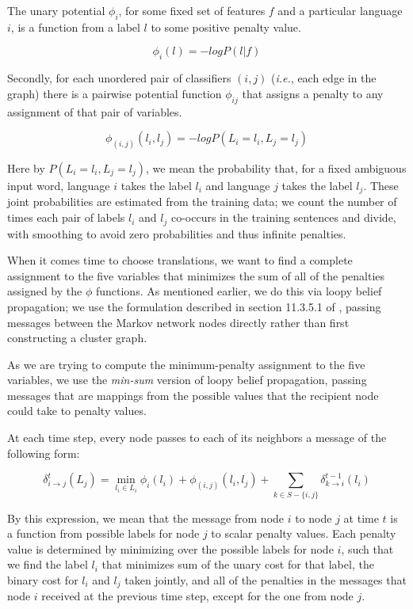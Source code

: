 \documentclass[11pt,letterpaper]{article}
\begin{document}
The unary potential $\phi_i$, for some fixed set of features $f$ and a
particular language $i$, is a function from a label $l$ to some positive
penalty value.

$$
\phi_i(l) = - log P(l | f)
$$

Secondly, for each unordered pair of classifiers $(i,j)$ (\emph{i.e.}, each
edge in the graph) there is a pairwise potential function $\phi_{ij}$ that
assigns a penalty to any assignment of that pair of variables.

$$
\phi_{(i,j)}(l_i, l_j) = - log P(L_i = l_i, L_j = l_j)
$$

Here by $P(L_i = l_i, L_j = l_j)$, we mean the probability that, for a fixed
ambiguous input word, language $i$ takes the label $l_i$ and language $j$ takes
the label $l_j$. These joint probabilities are estimated from the training
data; we count the number of times each pair of labels $l_i$ and $l_j$
co-occurs in the training sentences and divide, with smoothing to avoid zero
probabilities and thus infinite penalties.

When it comes time to choose translations, we want to find a complete
assignment to the five variables that minimizes the sum of all of the penalties
assigned by the $\phi$ functions. As mentioned earlier, we do this via loopy
belief propagation; we use the formulation described in section 11.3.5.1 of
\cite{Koller+Friedman:09}, passing messages between the Markov network nodes
directly rather than first constructing a cluster graph.

As we are trying to compute the minimum-penalty assignment to the five
variables, we use the \emph{min-sum} version of loopy belief propagation,
passing messages that are mappings from the possible values that the recipient
node could take to penalty values.

At each time step, every node passes to each of its neighbors a message of the
following form:

\begin{dmath*}
\delta_{i \rightarrow j}^{t} (L_j) =
  \min_{l_i \in L_i}
  \phi_i(l_i) +
  \phi_{(i,j)}(l_i, l_j) +
  \sum_{k \in S - \lbrace i,j \rbrace}
  \delta_{k \rightarrow i}^{t-1} (l_i)
\end{dmath*}

By this expression, we mean that the message from node $i$ to node $j$ at time
$t$ is a function from possible labels for node $j$ to scalar penalty values.
Each penalty value is determined by minimizing over the possible labels for
node $i$, such that we find the label $l_i$ that minimizes sum of the unary
cost for that label, the binary cost for $l_i$ and $l_j$ taken jointly, and all
of the penalties in the messages that node $i$ received at the previous time
step, except for the one from node $j$.
\end{document}
